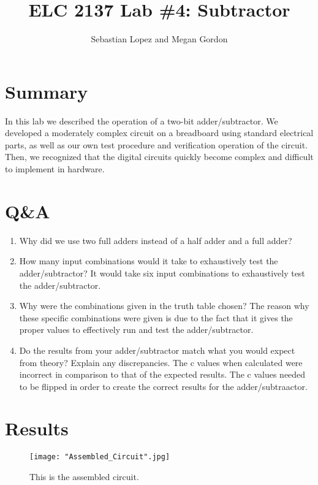 \documentclass[11pt]{article}
\begin{document}
\title{ELC 2137 Lab \#4: Subtractor}
\author{Sebastian Lopez and Megan Gordon}

\maketitle


\section*{Summary}

In this lab we described the operation of a two-bit adder/subtractor. We developed a moderately complex circuit on a breadboard using standard electrical parts, as well as our own test procedure and verification operation of the circuit. Then, we recognized that the digital circuits quickly become complex and difficult to implement in hardware. 

\section*{Q\&A}

\begin{enumerate}
	\item Why did we use two full adders instead of a half adder and a full adder? 
	
	\item How many input combinations would it take to exhaustively test the adder/subtractor? 
	It would take six input combinations to exhaustively test the adder/subtractor.
	\item Why were the combinations given in the truth table chosen?
	The reason why these specific combinations were given is due to the fact that it gives the proper values to effectively run and test the adder/subtractor. 
	\item Do the results from your adder/subtractor match what you would expect from theory? Explain any discrepancies. 
	The c values when calculated were incorrect in comparison to that of the expected results. The c values needed to be flipped in order to create the correct results for the adder/subtraactor. 
	
\end{enumerate}

\section*{Results}

\begin{figure}[ht]\centering
	\texttt{[image: "Assembled\_Circuit".jpg]}
	\caption{This is the assembled circuit.}
	\label{fig:circuit_demonstration}			%
\end{figure}
\end{document}
